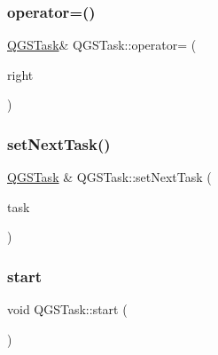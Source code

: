 \subsubsection{\texorpdfstring{operator=()}{operator=()}\hspace{0.1cm}{\footnotesize\ttfamily [2/2]}}
{\footnotesize\ttfamily \mbox{\hyperlink{class_q_g_s_task}{Q\+G\+S\+Task}}\& Q\+G\+S\+Task\+::operator= (\begin{DoxyParamCaption}\item[{\mbox{\hyperlink{class_q_g_s_task}{Q\+G\+S\+Task}} \&\&}]{right }\end{DoxyParamCaption})\hspace{0.3cm}{\ttfamily [delete]}}

\mbox{\label{class_q_g_s_task_af8a151adffe8b75daab58c6ec3f8b8eb}} 
\subsubsection{\texorpdfstring{set\+Next\+Task()}{setNextTask()}}
{\footnotesize\ttfamily \mbox{\hyperlink{class_q_g_s_task}{Q\+G\+S\+Task}} \& Q\+G\+S\+Task\+::set\+Next\+Task (\begin{DoxyParamCaption}\item[{\mbox{\hyperlink{class_q_g_s_task}{Q\+G\+S\+Task}} $\ast$}]{task }\end{DoxyParamCaption})}

\mbox{\label{class_q_g_s_task_ace8c165d39458b4a2e411d02c70c2e2f}} 
\subsubsection{\texorpdfstring{start}{start}}
{\footnotesize\ttfamily void Q\+G\+S\+Task\+::start (\begin{DoxyParamCaption}{ }\end{DoxyParamCaption})\hspace{0.3cm}{\ttfamily [slot]}}

\mbox{\label{class_q_g_s_task_acda0849a1cceb9b118f44e0c53f92911}} 
